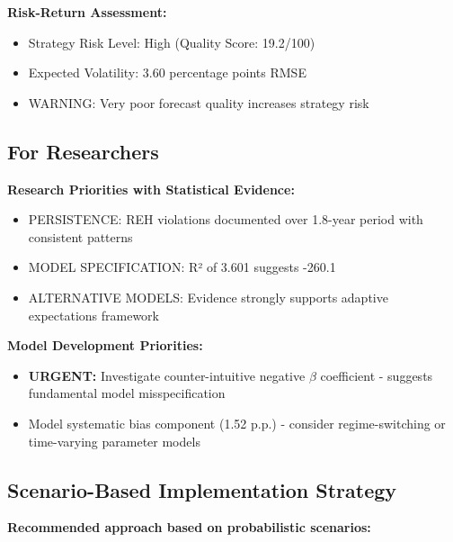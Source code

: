 \documentclass[11pt,a4paper]{article}
\begin{document}
\textbf{Risk-Return Assessment:}
\begin{itemize}
\item Strategy Risk Level: High (Quality Score: 19.2/100)
\item Expected Volatility: 3.60 percentage points RMSE
\item \textcolor{academicred}{WARNING: Very poor forecast quality increases strategy risk}
\end{itemize}

\subsection{For Researchers}
\textbf{Research Priorities with Statistical Evidence:}

\begin{itemize}
  \item PERSISTENCE: REH violations documented over 1.8-year period with consistent patterns
  \item MODEL SPECIFICATION: R² of 3.601 suggests -260.1%
  \item ALTERNATIVE MODELS: Evidence strongly supports adaptive expectations framework
\end{itemize}

\textbf{Model Development Priorities:}
\begin{itemize}
  \item \textbf{URGENT:} Investigate counter-intuitive negative $\beta$ coefficient - suggests fundamental model misspecification
  \item Model systematic bias component (1.52 p.p.) - consider regime-switching or time-varying parameter models
\end{itemize}

\subsection{Scenario-Based Implementation Strategy}
\textbf{Recommended approach based on probabilistic scenarios:}
\end{document}
